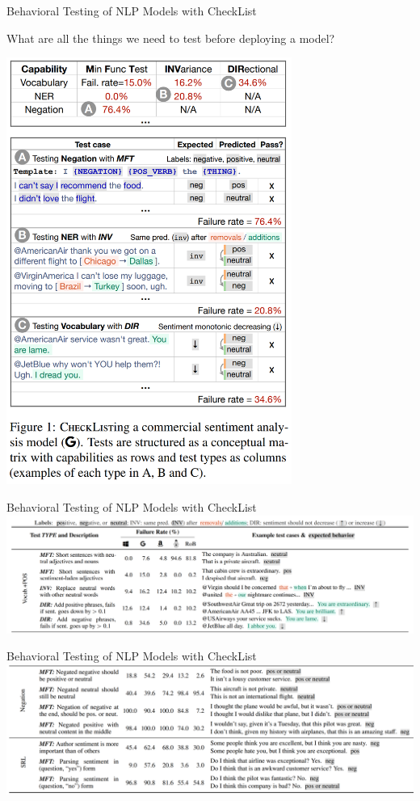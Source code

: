 \begin{vbframe}{Behavioral Testing of NLP Models with CheckList}

	What are all the things we need to test before deploying a model?

	\includegraphics[width=0.7\textwidth]{evaluation_figures/checklist_start.png}
\end{vbframe}

\begin{vbframe}{Behavioral Testing of NLP Models with CheckList}
	\vfill
	\includegraphics[width=\textwidth]{evaluation_figures/checklist_vocab.png}
	\vfill
\end{vbframe}

\begin{vbframe}{Behavioral Testing of NLP Models with CheckList}
	\vfill
	\includegraphics[width=\textwidth]{evaluation_figures/checklist_negation.png}
	\vfill
\end{vbframe}

